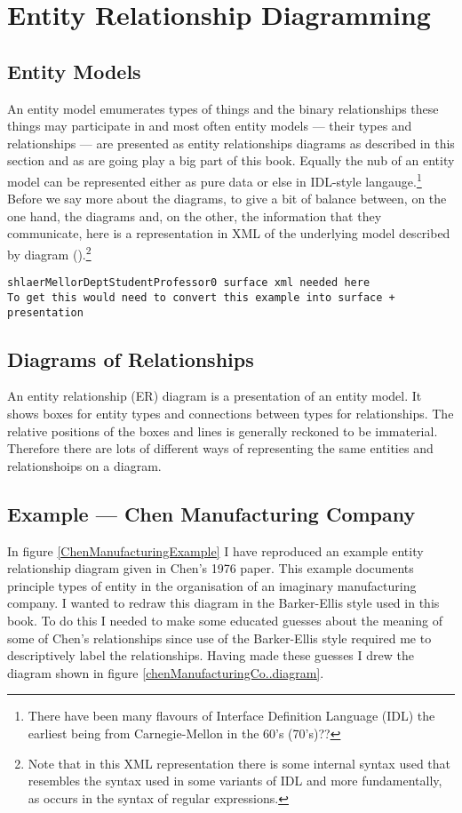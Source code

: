 \section{Entity Relationship Diagramming}
\label{EntityRelationshipDiagramming}

\subsection{Entity Models}

\mynote
An entity model emumerates types of things and the binary relationships these things may participate in and
most often entity models --- their types and relationships --- are presented as entity relationships diagrams
as described in this section and as are going play a big part of this book. 
Equally the nub of an entity model can be represented either as pure data 
or else in IDL-style langauge.\footnote{There have been many flavours of Interface Definition Language (IDL) the earliest being from Carnegie-Mellon in the 60's (70's)??} 
Before we say more about the diagrams, to give a bit of balance between, on the one hand, the diagrams and,
on the other, the information that they communicate, here is a representation in XML of the underlying model described by diagram ().\footnote{Note that in this XML representation there is some internal syntax used that resembles the syntax used in some variants of IDL and more fundamentally, as occurs in the syntax of regular expressions.} 

\begin{verbatim}
shlaerMellorDeptStudentProfessor0 surface xml needed here
To get this would need to convert this example into surface + presentation
\end{verbatim}

\subsection{Diagrams of Relationships}
\mynote
An entity relationship (ER) diagram is a presentation of an entity model.
It shows boxes for entity types and connections between types for relationships.
\mynote
The relative positions of the boxes and lines is generally reckoned to be immaterial. Therefore there 
are lots of different ways of representing the same entities and relationshoips on a diagram. 
\subsection{Example --- Chen Manufacturing Company}
\label{ChenManufacturingCompany}
In figure \ref{ChenManufacturingExample} I have reproduced an example entity relationship diagram  given in Chen's 1976 paper. This example documents principle types of entity in the organisation of an imaginary manufacturing company.  I wanted to redraw
this diagram in the Barker-Ellis style used in this book. To do this I needed to make some educated guesses about the meaning of some of Chen's relationships since use of the Barker-Ellis style  required me to descriptively label the relationships. Having made these guesses I drew the diagram shown
 in figure \ref{chenManufacturingCo..diagram}. 

